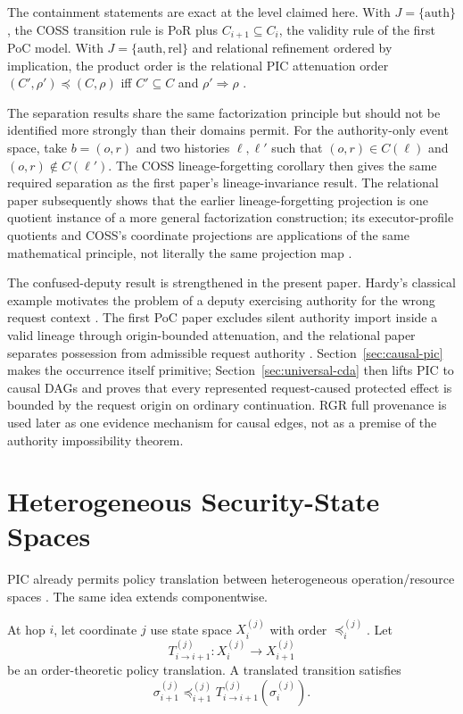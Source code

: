 \documentclass[10pt,twocolumn]{article}
\newcommand{\Model}{\textnormal{\textsc{COSS}}\xspace}
\newcommand{\coord}{\sigma}
\begin{document}
The containment statements are exact at the level claimed here.  With
$J=\{\mathrm{auth}\}$, the \Model transition rule is PoR plus
$C_{i+1}\subseteq C_i$, the validity rule of the first PoC model.  With
$J=\{\mathrm{auth},\mathrm{rel}\}$ and relational refinement ordered by
implication, the product order is the relational PIC attenuation order
$(C',\rho')\preceq(C,\rho)$ iff $C'\subseteq C$ and
$\rho'\Rightarrow\rho$ \cite{gallo_relational2026}.

The separation results share the same factorization principle but should not be
identified more strongly than their domains permit.  For the authority-only
event space, take $b=(o,r)$ and two histories $\ell,\ell'$ such that
$(o,r)\in C(\ell)$ and $(o,r)\notin C(\ell')$.  The \Model
lineage-forgetting corollary then gives the same required separation as the
first paper's lineage-invariance result.  The relational paper subsequently
shows that the earlier lineage-forgetting projection is one quotient instance
of a more general factorization construction; its executor-profile quotients and
\Model's coordinate projections are applications of the same mathematical
principle, not literally the same projection map \cite{gallo_relational2026}.

The confused-deputy result is strengthened in the present paper. Hardy's
classical example motivates the problem of a deputy exercising authority for
the wrong request context \cite{hardy1988}. The first PoC paper excludes silent
authority import inside a valid lineage through origin-bounded attenuation, and
the relational paper separates possession from admissible request authority
\cite{gallo_relational2026}. Section~\ref{sec:causal-pic} makes the occurrence
itself primitive; Section~\ref{sec:universal-cda} then lifts PIC to causal DAGs
and proves that every represented request-caused protected effect is bounded by
the request origin on ordinary continuation. RGR full provenance is used later
as one evidence mechanism for causal edges, not as a premise of the authority
impossibility theorem.


\section{Heterogeneous Security-State Spaces}

PIC already permits policy translation between heterogeneous operation/resource
spaces \cite{gallo_poc2026}.  The same idea extends componentwise.

At hop $i$, let coordinate $j$ use state space $X_i^{(j)}$ with order
$\preceq_i^{(j)}$.  Let
\begin{equation}
  T_{i\rightarrow i+1}^{(j)}:
  X_i^{(j)}\to X_{i+1}^{(j)}
\end{equation}
be an order-theoretic policy translation.  A translated transition satisfies
\begin{equation}
  \coord_{i+1}^{(j)}
  \preceq_{i+1}^{(j)}
  T_{i\rightarrow i+1}^{(j)}(\coord_i^{(j)}).
  \label{eq:translated-transition}
\end{equation}
\end{document}
